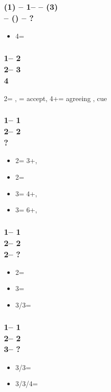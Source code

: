 \documentclass[12pt, a4paper]{article}
\begin{document}
\subsubsection*{(1\diams) -- 1\spades -- \dbl -- (3\spades)\\
                \dbl -- (\pass) -- ?}
\begin{itemize}
    \item 4\minor = \forc
\end{itemize}

\subsubsection*{1\hearts -- 2\hearts\\
                2\nt -- 3\spades\\
                4\clubs}
2\nt = \invp, \spades = accept, 4+\clubs = agreeing \spades, cue

\subsubsection*{1\hearts -- 1\spades\\
                2\clubs -- 2\hearts\\
                ?}
\begin{itemize}
    \item 2\spades = 3+\spades, \fonce
    \item 2\nt = \gf
    \item 3\minor = 4+\minor, \fonce
    \item 3\hearts = 6+\hearts, \inv
\end{itemize}

\subsubsection*{1\hearts -- 1\spades\\
                2\clubs -- 2\hearts\\
                2\spades -- ?}
\begin{itemize}
    \item 2\nt = \gf
    \item 3\minor = \gf
    \item 3\hearts/3\spades = \nf
\end{itemize}

\subsubsection*{1\hearts -- 1\spades\\
                2\clubs -- 2\hearts\\
                3\minor -- ?}
\begin{itemize}
    \item 3\diams/3\nt = \gf
    \item 3\hearts/3\spades/4\minor = \nf
\end{itemize}
\end{document}
